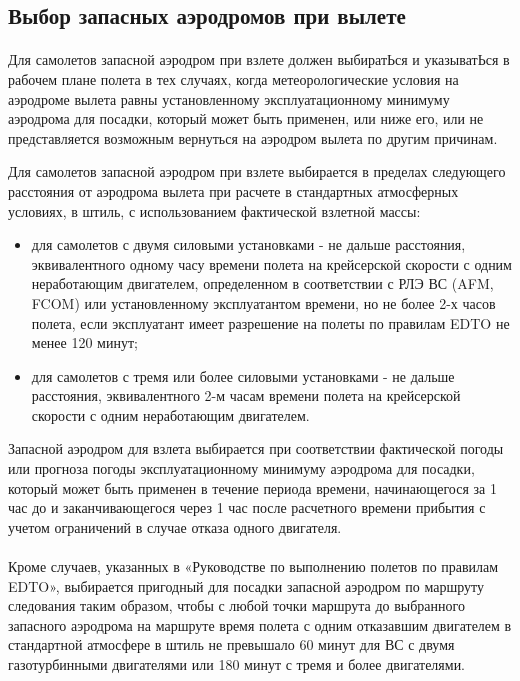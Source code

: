 \subsection{Выбор запасных аэродромов при вылете}


\paragraph{} \label{par:altrule2} Для самолетов запасной аэродром при взлете должен выбиратЬся и указыватЬся в рабочем плане полета в тех случаях, когда метеорологические условия на аэродроме вылета равны установленному эксплуатационному минимуму аэродрома для посадки, который может быть применен, или ниже его, или не представляется возможным вернуться на аэродром вылета по другим причинам. 

Для самолетов запасной аэродром при взлете выбирается в пределах следующего расстояния от аэродрома вылета при расчете в стандартных атмосферных условиях, в штиль, с использованием фактической взлетной массы:
\begin{itemize}
    \item для самолетов с двумя силовыми установками - не дальше расстояния, эквивалентного одному часу времени полета на крейсерской скорости с одним неработающим двигателем, определенном в соответствии с РЛЭ ВС (AFM, FCOM) или установленному эксплуатантом времени, но не более 2-х часов полета, если эксплуатант имеет разрешение на полеты по правилам EDTO не менее 120 минут;
    \item для самолетов с тремя или более силовыми установками - не дальше расстояния, эквивалентного 2-м часам времени полета на крейсерской скорости с одним неработающим двигателем.
\end{itemize} 

Запасной аэродром для взлета выбирается при соответствии фактической погоды или прогноза погоды эксплуатационному минимуму аэродрома для посадки, который может быть применен в течение периода времени, начинающегося за 1 час до и заканчивающегося через 1 час после расчетного времени прибытия с учетом ограничений в случае отказа одного двигателя. 

\paragraph{} \label{par:altrule} Кроме случаев, указанных в «Руководстве по выполнению полетов по правилам EDTO», выбирается пригодный для посадки запасной аэродром по маршруту следования таким образом, чтобы с любой точки маршрута до выбранного запасного аэродрома на маршруте время полета с одним отказавшим двигателем в стандартной атмосфере в штиль не превышало 60 минут для ВС с двумя газотурбинными двигателями или 180 минут с тремя и более двигателями.

